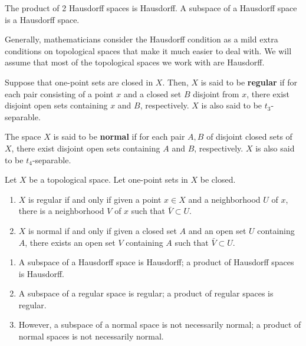     \begin{theorem}
    The product of 2 Hausdorff spaces is Hausdorff. A subspace of a Hausdorff space is a Hausdorff space. 
    \end{theorem}

    Generally, mathematicians consider the Hausdorff condition as a mild extra conditions on topological spaces that make it much easier to deal with. We will assume that most of the topological spaces we work with are Hausdorff. 


    \begin{definition}
    Suppose that one-point sets are closed in $X$. Then, $X$ is said to be \textbf{regular} if for each pair consisting of a point $x$ and a closed set $B$ disjoint from $x$, there exist disjoint open sets containing $x$ and $B$, respectively. $X$ is also said to be $t_3$-separable. 
    \end{definition}

    \begin{definition}
    The space $X$ is said to be \textbf{normal} if for each pair $A, B$ of disjoint closed sets of $X$, there exist disjoint open sets containing $A$ and $B$, respectively. $X$ is also said to be $t_4$-separable. 
    \end{definition}

    \begin{lemma}
    Let $X$ be a topological space. Let one-point sets in $X$ be closed. 
    \begin{enumerate}
        \item $X$ is regular if and only if given a point $x \in X$ and a neighborhood $U$ of $x$, there is a neighborhood $V$ of $x$ such that $\bar{V} \subset U$. 
        \item $X$ is normal if and only if given a closed set $A$ and an open set $U$ containing $A$, there exists an open set $V$ containing $A$ such that $\bar{V} \subset U$. 
    \end{enumerate}
    \end{lemma}

    \begin{theorem}
    \begin{enumerate}
        \item A subspace of a Hausdorff space is Hausdorff; a product of Hausdorff spaces is Hausdorff. 
        \item A subspace of a regular space is regular; a product of regular spaces is regular. 
        \item However, a subspace of a normal space is not necessarily normal; a product of normal spaces is not necessarily normal. 
    \end{enumerate}
    \end{theorem}

